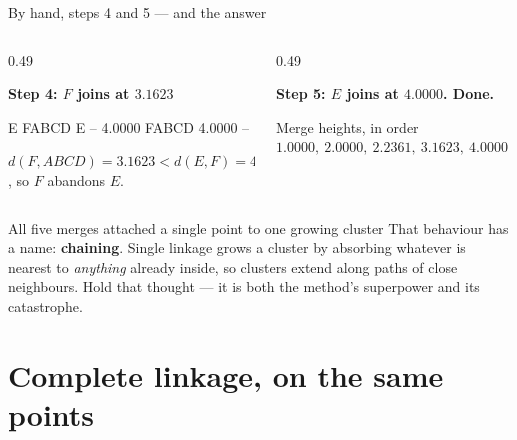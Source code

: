 \documentclass[aspectratio=169]{beamer}
\begin{document}
\begin{frame}[fragile,shrink=4]{By hand, steps 4 and 5 --- and the answer}
  \begin{columns}[T]
    \begin{column}{0.49\textwidth}
      \begin{center}\small\textbf{Step 4: $F$ joins at $3.1623$}\end{center}
\begin{outblk}
                   E     FABCD
E                 --    4.0000
FABCD         4.0000        --
\end{outblk}
      \begin{center}\scriptsize
        $d(F, ABCD) = 3.1623 < d(E,F) = 4.0000$, so $F$ abandons $E$.
      \end{center}
    \end{column}
    \begin{column}{0.49\textwidth}
      \begin{center}\small\textbf{Step 5: $E$ joins at $4.0000$. Done.}\end{center}
      \begin{exampleblock}{Merge heights, in order}
        \centering\large
        $1.0000,\ 2.0000,\ 2.2361,\ 3.1623,\ 4.0000$
      \end{exampleblock}
    \end{column}
  \end{columns}
  \vspace{0.3em}
  \begin{alertblock}{All five merges attached a single point to one growing cluster}
    \centering
    That behaviour has a name: \textbf{chaining}. Single linkage grows a
    cluster by absorbing whatever is nearest to \emph{anything} already
    inside, so clusters extend along paths of close neighbours. Hold that
    thought --- it is both the method's superpower and its catastrophe.
  \end{alertblock}
\end{frame}

\section[Complete linkage]{Complete linkage, on the same points}
\label{sec:complete}
\end{document}
